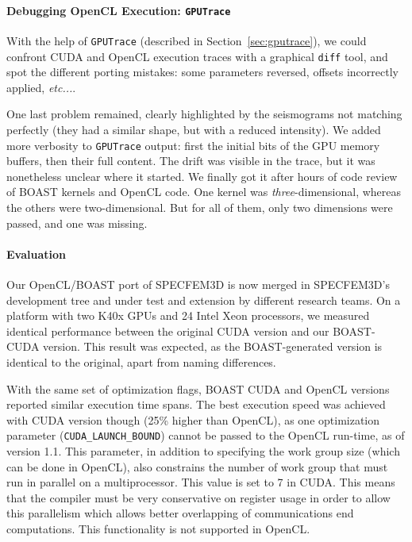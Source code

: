 \documentclass{IEEEtran}
\newcommand{\latin}[1]{\textit{#1}}
\newcommand{\etc}[1]{\latin{etc...}}
\newcommand{\code}[1]{\texttt{#1}}
\begin{document}
\paragraph{Debugging OpenCL Execution: \code{GPUTrace}} 
With the help of \code{GPUTrace} (described in Section~\ref{sec:gputrace}), we
could confront CUDA and OpenCL execution traces with a graphical \code{diff}
tool, and spot the different porting mistakes: some parameters reversed,
offsets incorrectly applied, \etc{}. 

One last problem remained, clearly highlighted by the seismograms not
matching perfectly (they had a similar shape, but with a reduced
intensity). We added more verbosity to \code{GPUTrace} output: first
the initial bits of the GPU memory buffers, then their full
content. The drift was visible in the trace, but it was nonetheless
unclear where it started. We finally got it after hours of code review
of BOAST kernels and OpenCL code. One kernel was
\emph{three}-dimensional, whereas the others were two-dimensional. But
for all of them, only two dimensions were passed, and one was
missing.

\paragraph{Evaluation} Our OpenCL/BOAST port of SPECFEM3D is now
merged in SPECFEM3D's development tree and under test and extension by
different research teams. On a platform with two K40x GPUs and 24 Intel
Xeon processors, we measured identical performance between the original
CUDA version and our BOAST-CUDA version. This result was expected, as
the BOAST-generated version is identical to the original, apart from
naming differences.

With the same set of
optimization flags, BOAST CUDA and OpenCL versions reported similar
execution time spans. The best execution speed was achieved with CUDA
version though (25\% higher than OpenCL), as one optimization parameter
(\code{CUDA\_LAUNCH\_BOUND}) cannot be passed to the OpenCL run-time, as of version
1.1. This parameter, in addition to specifying the work group size (which can
be done in OpenCL), also constrains the number of work group that must run in
parallel on a multiprocessor. This value is set to 7 in CUDA. This means that
the compiler must be very conservative on register usage in order to allow this
parallelism which allows better overlapping of communications end computations.
This functionality is not supported in OpenCL.
\end{document}
